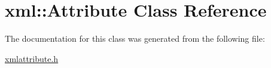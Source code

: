 \hypertarget{classxml_1_1Attribute}{
\section{xml::Attribute Class Reference}
\label{dc/dc7/classxml_1_1Attribute}
}


The documentation for this class was generated from the following file:\begin{DoxyCompactItemize}
\item 
\hyperlink{xmlattribute_8h}{xmlattribute.h}\end{DoxyCompactItemize}
